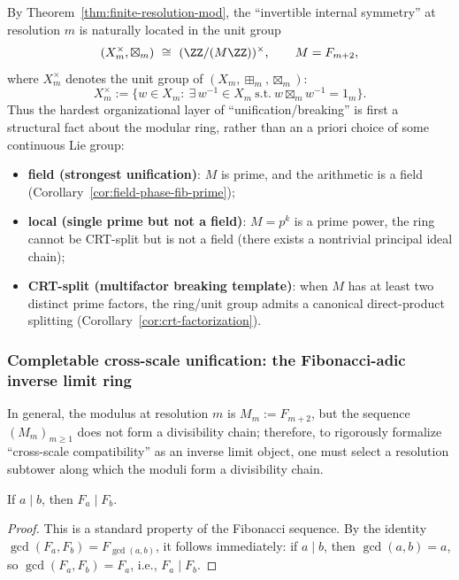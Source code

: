 \begin{remark}\label{rem:ring-phase-trichotomy}
By Theorem~\ref{thm:finite-resolution-mod}, the ``invertible internal symmetry'' at resolution $m$ is naturally located in the unit group
\[
(X_m^\times,\boxtimes_m)\ \cong\ (\ZZ/(M\ZZ))^\times,\qquad M=F_{m+2},
\]
where $X_m^\times$ denotes the unit group of $(X_m,\boxplus_m,\boxtimes_m)$:
\[
X_m^\times:=\{w\in X_m:\ \exists\,w^{-1}\in X_m\ \text{s.t.}\ w\boxtimes_m w^{-1}=1_m\}.
\]
Thus the hardest organizational layer of ``unification/breaking'' is first a structural fact about the modular ring, rather than an a priori choice of some continuous Lie group:
\begin{itemize}
  \item \textbf{field (strongest unification)}: $M$ is prime, and the arithmetic is a field (Corollary~\ref{cor:field-phase-fib-prime});
  \item \textbf{local (single prime but not a field)}: $M=p^k$ is a prime power, the ring cannot be CRT-split but is not a field (there exists a nontrivial principal ideal chain);
  \item \textbf{CRT-split (multifactor breaking template)}: when $M$ has at least two distinct prime factors, the ring/unit group admits a canonical direct-product splitting (Corollary~\ref{cor:crt-factorization}).
\end{itemize}
\end{remark}

\subsubsection{Completable cross-scale unification: the Fibonacci-adic inverse limit ring}\label{subsubsec:fib-adic-inverse-limit}
In general, the modulus at resolution $m$ is $M_m:=F_{m+2}$, but the sequence $(M_m)_{m\ge 1}$ does not form a divisibility chain;
therefore, to rigorously formalize ``cross-scale compatibility'' as an inverse limit object, one must select a resolution subtower along which the moduli form a divisibility chain.

\begin{lemma}\label{lem:fib-divisibility-chain}
If $a\mid b$, then $F_a\mid F_b$.
\end{lemma}
\begin{proof}
This is a standard property of the Fibonacci sequence. By the identity
\(
\gcd(F_a,F_b)=F_{\gcd(a,b)}
\),
it follows immediately: if $a\mid b$, then $\gcd(a,b)=a$, so $\gcd(F_a,F_b)=F_a$, i.e., $F_a\mid F_b$.
\end{proof}

